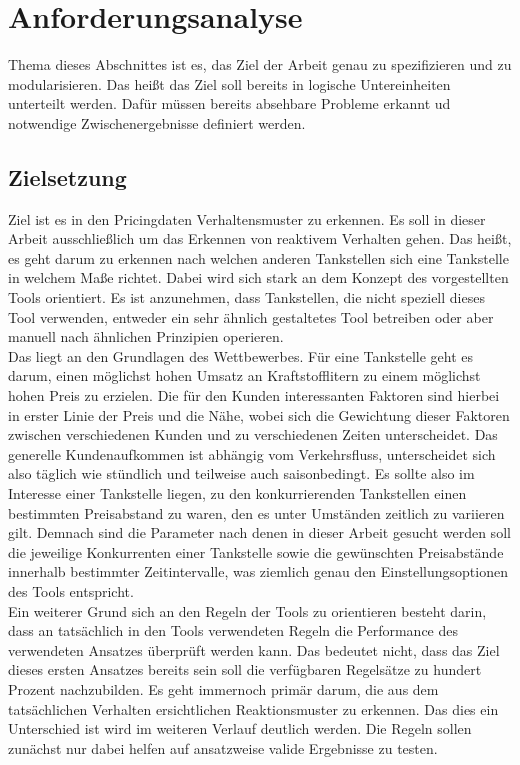 \documentclass[12pt,a4paper,bibliography=totocnumbered,listof=totocnumbered]{scrartcl}
\begin{document}
\section{Anforderungsanalyse}
Thema dieses Abschnittes ist es, das Ziel der Arbeit genau zu spezifizieren und zu modularisieren. Das heißt das Ziel soll bereits in logische Untereinheiten unterteilt werden. Dafür müssen bereits absehbare Probleme erkannt ud notwendige Zwischenergebnisse definiert werden.

\subsection{Zielsetzung}
Ziel ist es in den Pricingdaten Verhaltensmuster zu erkennen. Es soll in dieser Arbeit ausschließlich um das Erkennen von reaktivem Verhalten gehen. Das heißt, es geht darum zu erkennen nach welchen anderen Tankstellen sich eine Tankstelle in welchem Maße richtet. Dabei wird sich stark an dem Konzept des vorgestellten Tools orientiert. Es ist anzunehmen, dass Tankstellen, die nicht speziell dieses Tool verwenden, entweder ein sehr ähnlich gestaltetes Tool betreiben oder aber manuell nach ähnlichen Prinzipien operieren.\\
Das liegt an den Grundlagen des Wettbewerbes. Für eine Tankstelle geht es darum, einen möglichst hohen Umsatz an Kraftstofflitern zu einem möglichst hohen Preis zu erzielen. Die für den Kunden interessanten Faktoren sind hierbei in erster Linie der Preis und die Nähe, wobei sich die Gewichtung dieser Faktoren zwischen verschiedenen Kunden und zu verschiedenen Zeiten unterscheidet. Das generelle Kundenaufkommen ist abhängig vom Verkehrsfluss, unterscheidet sich also täglich wie stündlich und teilweise auch saisonbedingt. Es sollte also im Interesse einer Tankstelle liegen, zu den konkurrierenden Tankstellen einen bestimmten Preisabstand zu waren, den es unter Umständen zeitlich zu variieren gilt. Demnach sind die Parameter nach denen in dieser Arbeit gesucht werden soll die jeweilige Konkurrenten einer Tankstelle sowie die gewünschten Preisabstände innerhalb bestimmter Zeitintervalle, was ziemlich genau den Einstellungsoptionen des Tools entspricht.\\
Ein weiterer Grund sich an den Regeln der Tools zu orientieren besteht darin, dass an tatsächlich in den Tools verwendeten Regeln die Performance des verwendeten Ansatzes überprüft werden kann. Das bedeutet nicht, dass das Ziel dieses ersten Ansatzes bereits sein soll die verfügbaren Regelsätze zu hundert Prozent nachzubilden. Es geht immernoch primär darum, die aus dem tatsächlichen Verhalten ersichtlichen Reaktionsmuster zu erkennen. Das dies ein Unterschied ist wird im weiteren Verlauf deutlich werden. Die Regeln sollen zunächst nur dabei helfen auf ansatzweise valide Ergebnisse zu testen.
\end{document}
